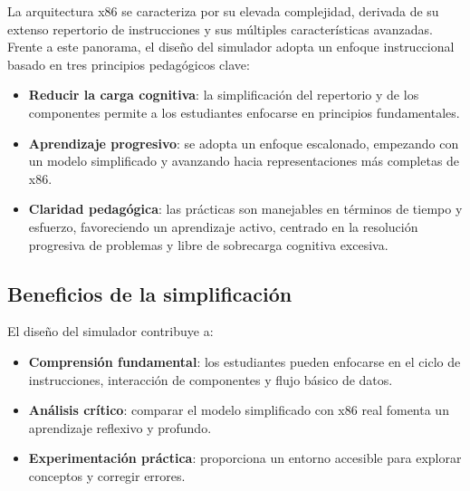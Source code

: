\documentclass[12pt,oneside]{templates/unerthesis}
\providecommand{\tightlist}{%
  \setlength{\itemsep}{0pt}\setlength{\parskip}{0pt}}
\begin{document}
La arquitectura x86 se caracteriza por su elevada complejidad, derivada de su extenso repertorio de instrucciones y sus múltiples características avanzadas. Frente a este panorama, el diseño del simulador adopta un enfoque instruccional basado en tres principios pedagógicos clave:

\begin{itemize}
\tightlist
\item
  \textbf{Reducir la carga cognitiva}: la simplificación del repertorio y de los componentes permite a los estudiantes enfocarse en principios fundamentales.
\item
  \textbf{Aprendizaje progresivo}: se adopta un enfoque escalonado, empezando con un modelo simplificado y avanzando hacia representaciones más completas de x86.
\item
  \textbf{Claridad pedagógica}: las prácticas son manejables en términos de tiempo y esfuerzo, favoreciendo un aprendizaje activo, centrado en la resolución progresiva de problemas y libre de sobrecarga cognitiva excesiva.
\end{itemize}

\hypertarget{beneficios-de-la-simplificaciuxf3n}{%
\subsection{Beneficios de la simplificación}\label{beneficios-de-la-simplificaciuxf3n}}

El diseño del simulador contribuye a:

\begin{itemize}
\tightlist
\item
  \textbf{Comprensión fundamental}: los estudiantes pueden enfocarse en el ciclo de instrucciones, interacción de componentes y flujo básico de datos.
\item
  \textbf{Análisis crítico}: comparar el modelo simplificado con x86 real fomenta un aprendizaje reflexivo y profundo.
\item
  \textbf{Experimentación práctica}: proporciona un entorno accesible para explorar conceptos y corregir errores.
\end{itemize}
\end{document}
